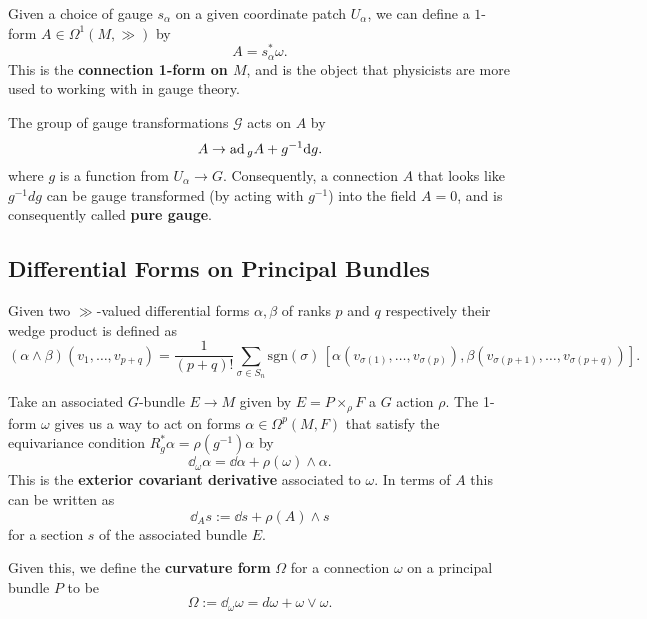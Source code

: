 		Given a choice of gauge $s_\alpha$ on a given coordinate patch $U_\alpha$, we can define a $1$-form $A \in \Omega^1(M,\gg)$ by
		\begin{equation}
			A = s_\alpha^* \omega.
		\end{equation}
		This is the \textbf{connection 1-form on $M$}, and is the object that physicists are more used to working with in gauge theory.
		\begin{fact}
			The group of gauge transformations $\mathcal G$ acts on $A$ by
			\[
				A \to \mathrm{ad}\,_{g} A + g^{-1} \mathrm{d} g.
			\]
			where $g$ is a function from $U_\alpha \to G$.
			Consequently, a connection $A$ that looks like $g^{-1} dg$ can be gauge transformed (by acting with $g^{-1}$) into the field $A=0$, and is consequently called \textbf{pure gauge}.
		\end{fact}
		

		\subsection{Differential Forms on Principal Bundles}

	

		\begin{defn}
			Given two $\gg$-valued differential forms $\alpha, \beta$ of ranks $p$ and $q$ respectively their wedge product is defined as
						\[
							(\alpha \wedge \beta)(v_1, \dots, v_{p+q}) = \frac{1}{(p+q)!} \sum_{\sigma \in S_n} \mathrm{sgn}(\sigma)\, [\alpha(v_{\sigma(1)}, \dots, v_{\sigma(p)}), \beta(v_{\sigma(p+1)}, \dots, v_{\sigma(p+q)})].
						\]
		\label{defn:wedgeforms}
		\end{defn}
		
		Take an associated $G$-bundle $E \to M$ given by $E = P \times_{\rho} F$ a $G$ action $\rho$. The 1-form $\omega$ gives us a way to act on forms $\alpha \in \Omega^p (M, F)$ that satisfy the equivariance condition $R_g^* \alpha = \rho(g^{-1}) \alpha$ by
		\[
			\dd_\omega \alpha = \dd \alpha + \rho(\omega) \wedge \alpha.
		\]
		This is the \textbf{exterior covariant derivative} associated to $\omega$. 
		In terms of $A$ this can be written as
		\begin{equation}
			\dd_A s := \dd s + \rho (A) \wedge s
		\end{equation}
		for a section $s$ of the associated bundle $E$.
		
		Given this, we define the \textbf{curvature form} $\Omega$ for a connection $\omega$ on a principal bundle $P$ to be
		\begin{equation}\label{curvature}
			\Omega := \dd_\omega \omega = d\omega + \omega \vee \omega.
		\end{equation}
		
